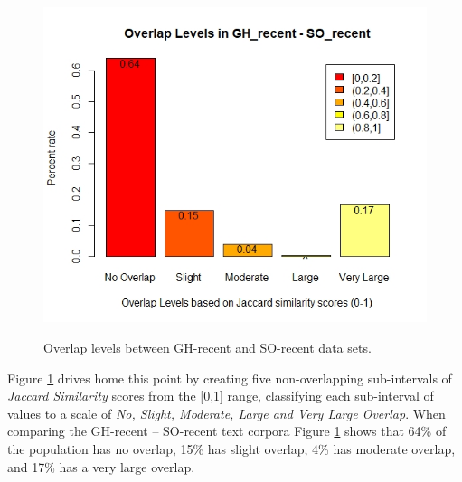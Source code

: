        \begin{figure}
          \centering
          \includegraphics[width=\textwidth]{figures/overlap_GH_SO_recent.jpeg}\\
          \caption{Overlap levels between GH-recent and SO-recent data sets.}
          \label{fig:overlap_GH_SO_recent}
        \end{figure}
        
         Figure \ref{fig:overlap_GH_SO_recent} drives home this point by creating five non-overlapping sub-intervals of \emph{Jaccard Similarity} scores from the [0,1] range, classifying each sub-interval of values to a scale of \emph{No, Slight, Moderate, Large and Very Large Overlap}. When comparing the GH-recent -- SO-recent text corpora Figure \ref{fig:overlap_GH_SO_recent} shows that 64\% of the population has no overlap, 15\% has slight overlap, 4\% has moderate overlap, and 17\% has a very large overlap. 
        
